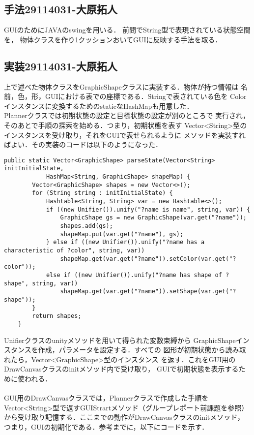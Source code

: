 \documentclass{jarticle}
\begin{document}
\subsection{手法29114031-大原拓人}
    GUIのためにJAVAのswingを用いる．
    前問でString型で表現されている状態空間を，
    物体クラスを作り1クッションおいてGUIに反映する手法を取る．

\subsection{実装29114031-大原拓人}
    上で述べた物体クラスをGraphicShapeクラスに実装する．物体が持つ情報は
    名前，色，形，GUIにおける表での座標である．Stringで表されている色を
    Colorインスタンスに変換するためのstaticなHashMapも用意した．\\
    Plannerクラスでは初期状態の設定と目標状態の設定が別のところで
    実行され，そのあとで手順の探索を始める．つまり，初期状態を表す
    Vector<String>型のインスタンスを受け取り，それをGUIで表せられるように
    メソッドを実装すればよい．その実装のコードは以下のようになった．

    \begin{lstlisting}[caption=GraphicShape.javaより]
    public static Vector<GraphicShape> parseState(Vector<String> initInitialState,
            HashMap<String, GraphicShape> shapeMap) {
        Vector<GraphicShape> shapes = new Vector<>();
        for (String string : initInitialState) {
            Hashtable<String, String> var = new Hashtable<>();
            if ((new Unifier()).unify("?name is name", string, var)) {
                GraphicShape gs = new GraphicShape(var.get("?name"));
                shapes.add(gs);
                shapeMap.put(var.get("?name"), gs);
            } else if ((new Unifier()).unify("?name has a characteristic of ?color", string, var))
                shapeMap.get(var.get("?name")).setColor(var.get("?color"));
            else if ((new Unifier()).unify("?name has shape of ?shape", string, var))
                shapeMap.get(var.get("?name")).setShape(var.get("?shape"));
        }
        return shapes;
    }
    \end{lstlisting}

    Unifierクラスのunityメソッドを用いて得られた変数束縛から
    GraphicShapeインスタンスを作成，パラメータを設定する．すべての
    図形が初期状態から読み取れたら，Vector<GraphicShape>型のインスタンス
    を返す．これをGUI用のDrawCanvasクラスのinitメソッド内で受け取り，
    GUIで初期状態を表示するために使われる．\\ \\
    GUI用のDrawCanvasクラスでは，Plannerクラスで作成した手順を
    Vector<String>型で返すGUIStrartメソッド（グループレポート前課題を参照）
    から受け取り記憶する．ここまでの動作がDrawCanvasクラスのinitメソッド，
    つまり，GUIの初期化である．参考までに，以下にコードを示す．
\end{document}
